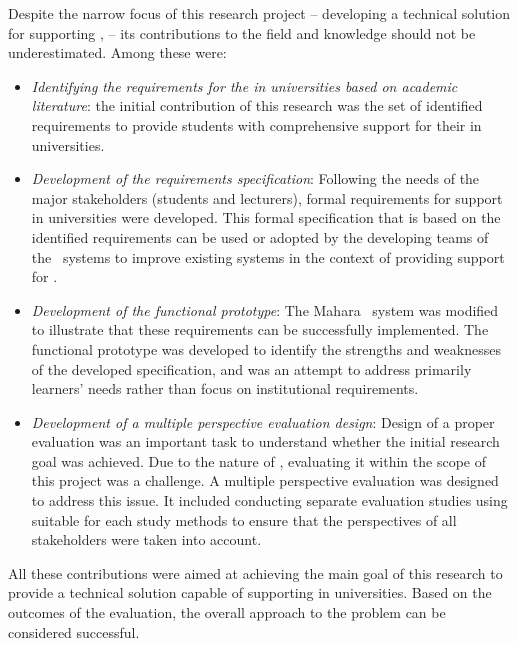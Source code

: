 Despite the narrow focus of this research project -- developing a technical
solution for supporting \LLLsn, -- its contributions to the field and knowledge
should not be underestimated. Among these were:
\begin{itemize}
  \item \textit{Identifying the requirements for the \LLLs in universities based
  on academic literature}: the initial contribution of this research was the set
  of identified requirements to provide students with comprehensive support for
  their \LLLs in universities. 
  
  \item \textit{Development of the requirements specification}: Following the
  needs of the major stakeholders (students and lecturers), formal requirements for \LLLs
  support in universities were developed. This formal specification that is
  based on the identified requirements can be used or adopted by the developing
  teams of the \ep~systems to improve existing systems in the context of
  providing support for \LLLsn.
  
  \item \textit{Development of the functional prototype}: The Mahara \ep~system
  was modified to illustrate that these requirements can be successfully
  implemented. The functional prototype was developed to identify the strengths
  and weaknesses of the developed specification, and was an attempt to address
  primarily learners' needs rather than focus on institutional requirements.
  
  \item \textit{Development of a multiple perspective evaluation design}: Design
  of a proper evaluation was an important task to understand whether the initial
  research goal was achieved. Due to the nature of \LLLsn, evaluating it within
  the scope of this project was a challenge. A multiple perspective evaluation
  was designed to address this issue. It included conducting separate evaluation
  studies using suitable for each study methods to ensure that the perspectives
  of all stakeholders were taken into account. 
\end{itemize}

All these contributions were aimed at achieving the main goal of this research
to provide a technical solution capable of supporting \LLLs in universities.
Based on the outcomes of the evaluation, the overall approach to the problem can
be considered successful.

